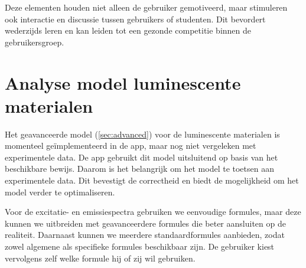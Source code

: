 Deze elementen houden niet alleen de gebruiker gemotiveerd, maar stimuleren ook interactie en discussie tussen gebruikers of studenten. Dit bevordert wederzijds leren en kan leiden tot een gezonde competitie binnen de gebruikersgroep.

\section{Analyse model luminescente materialen}

Het geavanceerde model (\cref{sec:advanced}) voor de luminescente materialen is momenteel ge\"implementeerd in de app, maar nog niet vergeleken met experimentele data. De app gebruikt dit model uitsluitend op basis van het beschikbare bewijs. Daarom is het belangrijk om het model te toetsen aan experimentele data. Dit bevestigt de correctheid en biedt de mogelijkheid om het model verder te optimaliseren.

Voor de excitatie- en emissiespectra gebruiken we eenvoudige formules, maar deze kunnen we uitbreiden met geavanceerdere formules die beter aansluiten op de realiteit. Daarnaast kunnen we meerdere standaardformules aanbieden, zodat zowel algemene als specifieke formules beschikbaar zijn. De gebruiker kiest vervolgens zelf welke formule hij of zij wil gebruiken.




